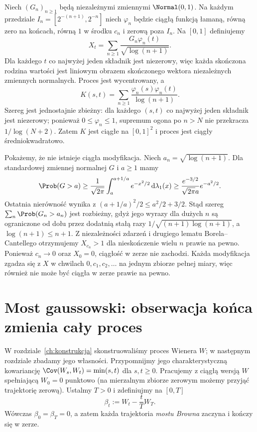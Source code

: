 \begin{przyklad}
Niech $(G_n)_{n\ge1}$ będą niezależnymi zmiennymi
$\Normal(0,1)$. Na każdym przedziale
$I_n=[2^{-(n+1)},2^{-n}]$ niech $\varphi_n$ będzie
ciągłą funkcją łamaną, równą zero na końcach,
równą $1$ w środku $c_n$ i zerową poza $I_n$.
Na $[0,1]$ definiujemy
\[
X_t=\sum_{n\ge1}\frac{G_n\varphi_n(t)}{\sqrt{\log(n+1)}}.
\]
Dla każdego $t$ co najwyżej jeden składnik jest
niezerowy, więc każda skończona rodzina wartości
jest liniowym obrazem skończonego wektora niezależnych
zmiennych normalnych. Proces jest wycentrowany, a
\[
K(s,t)=\sum_{n\ge1}\frac{\varphi_n(s)\varphi_n(t)}{\log(n+1)}.
\]
Szereg jest jednostajnie zbieżny: dla każdego $(s,t)$
co najwyżej jeden składnik jest niezerowy; ponieważ
$0\le\varphi_n\le1$, supremum ogona po $n>N$
nie przekracza $1/\log(N+2)$.
Zatem $K$ jest ciągłe na $[0,1]^2$ i proces jest
ciągły średniokwadratowo.

Pokażemy, że nie istnieje ciągła modyfikacja.
Niech $a_n=\sqrt{\log(n+1)}$. Dla standardowej
zmiennej normalnej $G$ i $a\ge1$ mamy
\[
\Prob(G>a)\ge
\frac1{\sqrt{2\pi}}\int_a^{a+1/a}e^{-x^2/2}\,
\mathrm d\lambda_1(x)
\ge \frac{e^{-3/2}}{\sqrt{2\pi}a}e^{-a^2/2}.
\]
Ostatnia nierówność wynika z
$(a+1/a)^2/2\le a^2/2+3/2$.
Stąd szereg $\sum_n\Prob(G_n>a_n)$ jest rozbieżny,
gdyż jego wyrazy dla dużych $n$ są ograniczone od dołu
przez dodatnią stałą razy
$1/\sqrt{(n+1)\log(n+1)}$, a $\log(n+1)\le n+1$.
Z niezależności zdarzeń i drugiego lematu
Borela--Cantellego otrzymujemy $X_{c_n}>1$
dla nieskończenie wielu $n$ prawie na pewno.
Ponieważ $c_n\to0$ oraz $X_0=0$, ciągłość w zerze
nie zachodzi. Każda modyfikacja zgadza się z $X$
w chwilach $0,c_1,c_2,\ldots$ na jednym zbiorze
pełnej miary, więc również nie może być ciągła
w zerze prawie na pewno.
\end{przyklad}

\section{Most gaussowski: obserwacja końca zmienia cały proces}
W rozdziale~\ref{ch:konstrukcja} skonstruowaliśmy proces
Wienera $W$; w następnym rozdziale zbadamy jego własności.
Przypomnijmy jego charakterystyczną kowariancję
$\Cov(W_s,W_t)=\min(s,t)$ dla $s,t\ge0$.
Pracujemy z ciągłą wersją $W$ spełniającą $W_0=0$
punktowo (na mierzalnym zbiorze zerowym możemy
przyjąć trajektorię zerową).
Ustalmy $T>0$ i zdefiniujmy na $[0,T]$
\[
\beta_t:=W_t-\frac{t}{T}W_T.
\]
Wówczas $\beta_0=\beta_T=0$, a zatem każda trajektoria
\emph{mostu Browna} zaczyna i kończy się w zerze.

